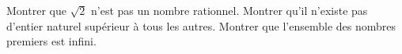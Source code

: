 %
%
	\begin{tasks}
		\task 	Montrer que $\sqrt{2}$  n'est pas un nombre rationnel.
		\task Montrer qu'il n'existe pas d'entier naturel supérieur à tous les autres.
		\task Montrer que l'ensemble des nombres premiers est infini.
	\end{tasks}
